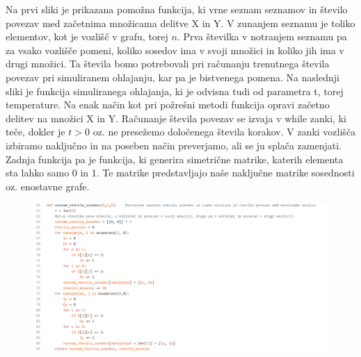 \documentclass[12pt,a4paper]{amsart}
\theoremstyle{definition} %
\theoremstyle{plain} %
\begin{document}
Na prvi sliki je prikazana pomožna funkcija, ki vrne seznam seznamov in število povezav med začetnima množicama delitve X in Y. V zunanjem seznamu je toliko elementov, kot je vozlišč v grafu, torej $n$. Prva številka v notranjem seznamu pa za vsako vozlišče pomeni, koliko sosedov ima v svoji množici in koliko jih ima v drugi množici. Ta števila bomo potrebovali pri računanju trenutnega števila povezav pri simuliranem ohlajanju, kar pa je bistvenega pomena. Na naslednji sliki je funkcija simuliranega ohlajanja, ki je odvisna tudi od parametra t, torej temperature. Na enak način kot pri požrešni metodi funkcija opravi začetno delitev na množici X in Y. Računanje števila povezav se izvaja v while zanki, ki teče, dokler je $t>0$ oz. ne presežemo določenega števila korakov. V zanki vozlišča izbiramo naključno in na poseben način preverjamo, ali se ju splača zamenjati. Zadnja funkcija pa je funkcija, ki generira simetrične matrike, katerih elementa sta lahko samo 0 in 1. Te matrike predstavljajo naše naključne matrike sosednosti oz. enostavne grafe.

\FloatBarrier
\begin{figure}
  \centering
  \includegraphics{seznam}
\end{figure}
\FloatBarrier
\end{document}
